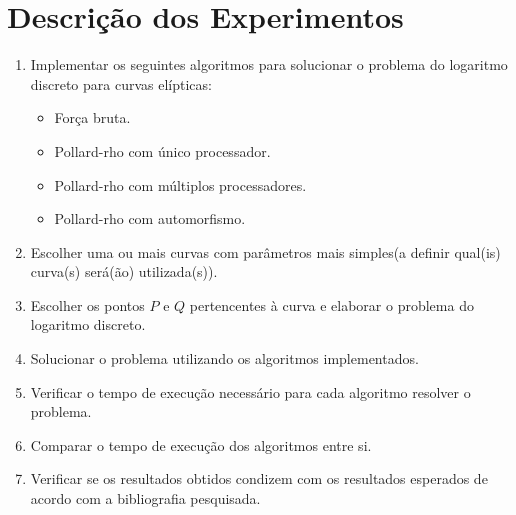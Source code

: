 \chapter{Descrição dos Experimentos}

\begin{enumerate}

\item Implementar os seguintes algoritmos para solucionar o problema do logaritmo discreto para curvas elípticas:
  \begin{itemize}
  \item Força bruta.
  \item Pollard-rho com único processador.
  \item Pollard-rho com múltiplos processadores.
  \item Pollard-rho com automorfismo.
  \end{itemize}
\item Escolher uma ou mais curvas com parâmetros mais simples(a definir qual(is) curva(s) será(ão) utilizada(s)).
\item Escolher os pontos $P$ e $Q$ pertencentes à curva e elaborar o problema do logaritmo discreto.
\item Solucionar o problema utilizando os algoritmos implementados.
\item Verificar o tempo de execução necessário para cada algoritmo resolver o problema.
\item Comparar o tempo de execução dos algoritmos entre si.
\item Verificar se os resultados obtidos condizem com os resultados esperados de acordo com a bibliografia pesquisada.

\end{enumerate}
